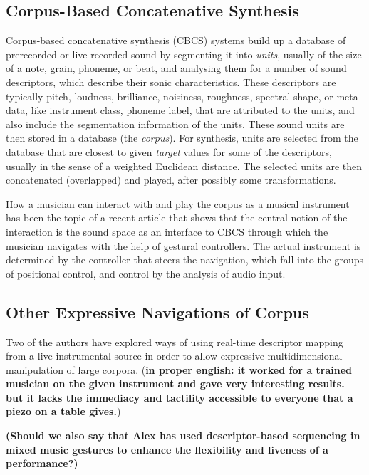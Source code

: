 \subsection{Corpus-Based Concatenative Synthesis}


Corpus-based concatenative synthesis (CBCS) \cite{Schwarz-ieeespm2007-concat} systems build up a database of prerecorded or live-recorded sound by segmenting it into
\textit{units}, usually of the size of a note, grain, phoneme, or beat, and analysing them for a
number of sound descriptors, which describe their sonic characteristics.
These descriptors are typically pitch, loudness, brilliance, noisiness, roughness, spectral shape, or meta-data, like instrument class, phoneme label, that are attributed to the units,
and also include the segmentation information of the units.
These sound units are then stored in a database (the \textit{corpus}).  For synthesis, units are
selected from the database that are closest to given \textit{target} values for some of the
descriptors, usually in the sense of a weighted Euclidean distance.
The selected units are then concatenated (overlapped) and played, after possibly some transformations.


How a musician can interact with and play the corpus as a musical instrument has been the topic of a recent article \cite{Schwarz-nime2012-sound-space} that shows that the central notion of the interaction is the sound space as an interface to CBCS through which the musician navigates with the help of gestural controllers.  
The actual instrument is determined by the controller that steers the
navigation, which fall into the groups of positional control, and control by the analysis of audio
input.

\subsection{Other Expressive Navigations of Corpus}

Two of the authors have explored ways of using real-time descriptor mapping from a live instrumental source in order to allow expressive multidimensional manipulation of large corpora. (\textbf{in proper english: it worked for a trained musician on the given instrument and gave very interesting results. but it lacks the immediacy and tactility accessible to everyone that a piezo on a table gives.})

\textbf{(Should we also say that Alex has used descriptor-based sequencing in mixed music gestures to enhance the flexibility and liveness of a performance?)}

